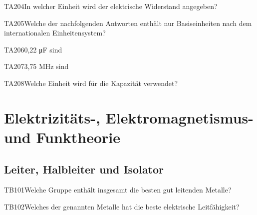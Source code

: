 \begin{question}{TA204}{In welcher Einheit wird der elektrische Widerstand angegeben?}
\end{question}

\begin{question}{TA205}{Welche der nachfolgenden Antworten enthält nur Basiseinheiten nach dem internationalen Einheitensystem?}
\end{question}

\begin{question}{TA206}{0,22 μF sind}
\end{question}

\begin{question}{TA207}{3,75 MHz sind}
\end{question}

\begin{question}{TA208}{Welche Einheit wird für die Kapazität verwendet?}
\end{question}

\section{Elektrizitäts-, Elektromagnetismus- und Funktheorie}

\subsection{Leiter, Halbleiter und Isolator}

\begin{question}{TB101}{Welche Gruppe enthält insgesamt die besten gut leitenden Metalle?}
\end{question}

\begin{question}{TB102}{Welches der genannten Metalle hat die beste elektrische Leitfähigkeit?}
\end{question}

